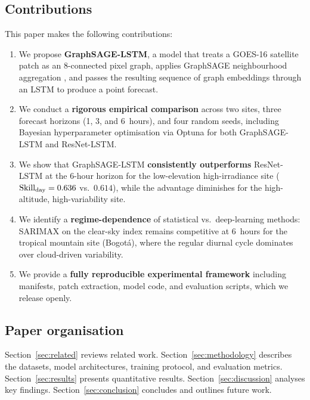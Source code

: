 \subsection*{Contributions}

This paper makes the following contributions:

\begin{enumerate}
  \item We propose \textbf{GraphSAGE-LSTM}, a model that treats a GOES-16 satellite
        patch as an 8-connected pixel graph, applies GraphSAGE neighbourhood
        aggregation \cite{hamilton2017}, and passes the resulting sequence of
        graph embeddings through an LSTM to produce a point forecast.

  \item We conduct a \textbf{rigorous empirical comparison} across two sites,
        three forecast horizons (1, 3, and 6~hours), and four random seeds,
        including Bayesian hyperparameter optimisation via Optuna \cite{akiba2019}
        for both GraphSAGE-LSTM and ResNet-LSTM.

  \item We show that GraphSAGE-LSTM \textbf{consistently outperforms} ResNet-LSTM
        at the 6-hour horizon for the low-elevation high-irradiance site
        ($\text{Skill}_\text{day} = 0.636$ vs.\ $0.614$), while the advantage diminishes for
        the high-altitude, high-variability site.

  \item We identify a \textbf{regime-dependence} of statistical vs.\ deep-learning
        methods: SARIMAX on the clear-sky index remains competitive at 6~hours
        for the tropical mountain site (Bogot{\'a}), where the regular diurnal
        cycle dominates over cloud-driven variability.

  \item We provide a \textbf{fully reproducible experimental framework} including
        manifests, patch extraction, model code, and evaluation scripts, which
        we release openly.
\end{enumerate}

\subsection*{Paper organisation}

Section~\ref{sec:related} reviews related work. Section~\ref{sec:methodology}
describes the datasets, model architectures, training protocol, and evaluation
metrics. Section~\ref{sec:results} presents quantitative results.
Section~\ref{sec:discussion} analyses key findings. Section~\ref{sec:conclusion}
concludes and outlines future work.
